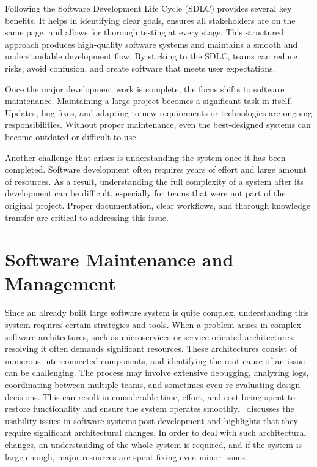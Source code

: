 Following the Software Development Life Cycle (SDLC) provides several key benefits. It helps in identifying clear goals, ensures all stakeholders are on the same page, and allows for thorough testing at every stage. This structured approach produces high-quality software systems and maintains a smooth and understandable development flow. By sticking to the SDLC, teams can reduce risks, avoid confusion, and create software that meets user expectations.

Once the major development work is complete, the focus shifts to software maintenance. Maintaining a large project becomes a significant task in itself. Updates, bug fixes, and adapting to new requirements or technologies are ongoing responsibilities. Without proper maintenance, even the best-designed systems can become outdated or difficult to use.

Another challenge that arises is understanding the system once it has been completed. Software development often requires years of effort and large amount of resources. As a result, understanding the full complexity of a system after its development can be difficult, especially for teams that were not part of the original project. Proper documentation, clear workflows, and thorough knowledge transfer are critical to addressing this issue.

\section{Software Maintenance and Management}

Since an already built large software system is quite complex, understanding this system requires certain strategies and tools. When a problem arises in complex software architectures, such as microservices or service-oriented architectures, resolving it often demands significant resources. These architectures consist of numerous interconnected components, and identifying the root cause of an issue can be challenging. The process may involve extensive debugging, analyzing logs, coordinating between multiple teams, and sometimes even re-evaluating design decisions. This can result in considerable time, effort, and cost being spent to restore functionality and ensure the system operates smoothly.~\citep{Folmer2005} discusses the usability issues in software systems post-development and highlights that they require significant architectural changes. In order to deal with such architectural changes, an understanding of the whole system is required, and if the system is large enough, major resources are spent fixing even minor issues.

